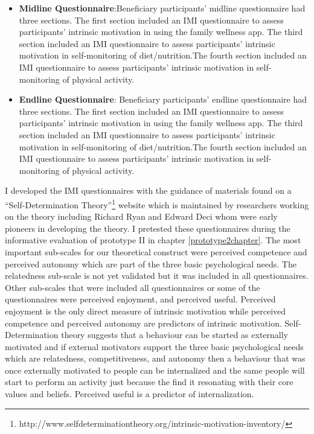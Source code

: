 \begin{enumerate}
\begin{itemize}
\item{\textbf{Midline Questionnaire}}:Beneficiary participants' midline questionnaire had three sections. The first section included an IMI questionnaire  to assess participants' intrinsic motivation in using the family wellness app. The third section included an IMI questionnaire to assess participants' intrinsic motivation in self-monitoring of diet/nutrition.The fourth section included an IMI questionnaire to assess participants' intrinsic motivation in self-monitoring of physical activity.

\item{\textbf{Endline Questionnaire}}: Beneficiary participants' endline questionnaire had three sections. The first section included an IMI questionnaire  to assess participants' intrinsic motivation in using the family wellness app. The third section included an IMI questionnaire to assess participants' intrinsic motivation in self-monitoring of diet/nutrition.The fourth section included an IMI questionnaire to assess participants' intrinsic motivation in self-monitoring of physical activity.
\end{itemize}
\end{enumerate}

I developed the IMI questionnaires with the guidance of materials found on a ``Self-Determination Theory''\footnote{http://www.selfdeterminationtheory.org/intrinsic-motivation-inventory/} website which is maintained by researchers working on the theory including Richard Ryan and Edward Deci\citep{deci1985intrinsic} whom were early pioneers in developing the theory. I pretested these questionnaires during the informative evaluation of prototype II in chapter \ref{prototype2chapter}. The most important sub-scales for our theoretical construct were perceived competence and perceived autonomy which are part of the three basic psychological needs. The relatedness sub-scale is not yet validated but it was included in all questionnaires. Other sub-scales that were included all questionnaires or some of the questionnaires were perceived enjoyment, and perceived useful. Perceived enjoyment is the only direct measure of intrinsic motivation while perceived competence and perceived autonomy are predictors of intrinsic motivation. Self-Determination theory suggests that a behaviour can be started as externally motivated and if external motivators support the three basic psychological needs which are relatedness, competitiveness, and autonomy then a behaviour that was once externally motivated to people can be internalized and the same people will start to perform an activity just because the find it resonating with their core values and beliefs. Perceived useful is a predictor of internalization.

